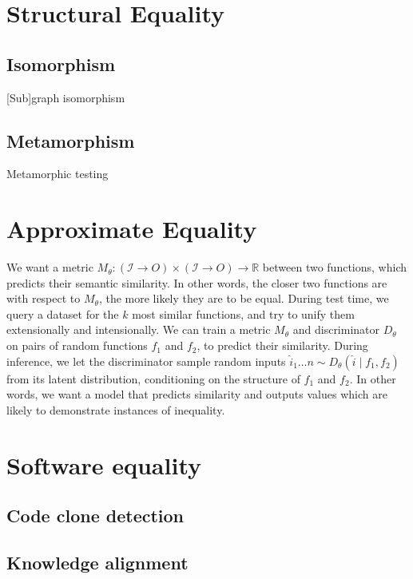 \documentclass[11pt]{article}
\begin{document}
    \section{Structural Equality}

    \subsection{Isomorphism}

    [Sub]graph isomorphism

    \subsection{Metamorphism}

    Metamorphic testing

    \section{Approximate Equality}

    We want a metric $M_\theta: (\mathcal{I}\rightarrow{O}) \times (\mathcal{I}\rightarrow{O})\rightarrow \mathbb{R}$ between two functions, which predicts their semantic similarity. In other words, the closer two functions are with respect to $M_\theta$, the more likely they are to be equal. During test time, we query a dataset for the $k$ most similar functions, and try to unify them extensionally and intensionally. We can train a metric $M_\theta$ and discriminator $D_\theta$ on pairs of random functions $f_1$ and $f_2$, to predict their similarity. During inference, we let the discriminator sample random inputs $\hat i_1 \ldots n \sim D_\theta(\hat i \mid f_1, f_2)$ from its latent distribution, conditioning on the structure of $f_1$ and $f_2$. In other words, we want a model that predicts similarity and outputs values which are likely to demonstrate instances of inequality.

    \section{Software equality}

    \subsection{Code clone detection}

    \subsection{Knowledge alignment}
\end{document}
